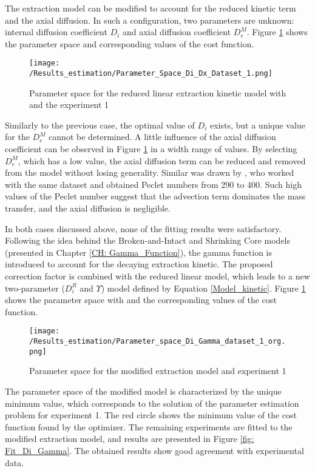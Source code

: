 \documentclass[../Supercritical_fluid_extraction_of_essential_oil_from_chamomile.tex]{subfiles}
\begin{document}
	The extraction model can be modified to account for the reduced kinetic term and the axial diffusion. In such a configuration, two parameters are unknown: internal diffusion coefficient $D_i$ and axial diffusion coefficient $D_e^M$. Figure \ref{fig: Fit_1_Di_Dx} shows the parameter space and corresponding values of the cost function.
	
	\begin{figure}[!h]
		\centering
		\texttt{[image: /Results\_estimation/Parameter\_Space\_Di\_Dx\_Dataset\_1.png]}
		\caption{Parameter space for the reduced linear extraction kinetic model with and the experiment 1}
		\label{fig: Fit_1_Di_Dx}
	\end{figure}
	
	Similarly to the previous case, the optimal value of $D_i$ exists, but a unique value for the $D_e^M$ cannot be determined. A little influence of the axial diffusion coefficient can be observed in Figure \ref{fig: Fit_1_Di_Dx} in a width range of values. By selecting $D_e^M$, which has a low value, the axial diffusion term can be reduced and removed from the model without losing generality. Similar was drawn by \citet{Rahimi2011}, who worked with the same dataset and obtained Peclet numbers from 290 to 400. Such high values of the Peclet number suggest that the advection term dominates the mass transfer, and the axial diffusion is negligible.
	
	In both cases discussed above, none of the fitting results were satisfactory. Following the idea behind the Broken-and-Intact and Shrinking Core models (presented in Chapter \ref{CH: Gamma_Function}), the gamma function is introduced to account for the decaying extraction kinetic. The proposed correction factor is combined with the reduced linear model, which leads to a new two-parameter ($D_i^R$ and $\Upsilon$) model defined by Equation \ref{Model_kinetic}. Figure \ref{fig: Fit_1_Di_Dx} shows the parameter space with and the corresponding values of the cost function.
	
	\begin{figure}[!h]
		\centering
		\texttt{[image: /Results\_estimation/Parameter\_space\_Di\_Gamma\_dataset\_1\_org.png]}
		\caption{Parameter space for the modified extraction model and experiment 1}
		\label{fig: Fit_1_Di_Gamma}
	\end{figure}
	
	The parameter space of the modified model is characterized by the unique minimum value, which corresponds to the solution of the parameter estimation problem for experiment 1. The red circle shows the minimum value of the cost function found by the optimizer. The remaining experiments are fitted to the modified extraction model, and results are presented in Figure \ref{fig: Fit_Di_Gamma}. The obtained results show good agreement with experimental data. 
\end{document}
